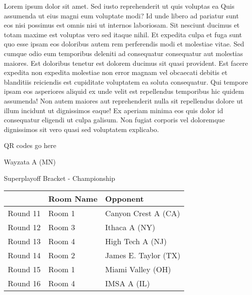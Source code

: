 \documentclass{article}%
\begin{document}
    Lorem ipsum dolor sit amet. Sed iusto reprehenderit ut quis voluptas ea Quis assumenda ut eius magni eum voluptate modi? Id unde libero ad pariatur sunt eos nisi possimus est omnis nisi ut internos laboriosam. Sit nesciunt ducimus et totam maxime est voluptas vero sed itaque nihil. Et expedita culpa et fuga sunt quo esse ipsam eos doloribus autem rem perferendis modi et molestiae vitae.\newline%
\newline%
    Sed cumque odio eum temporibus deleniti ad consequatur consequatur aut molestias maiores. Est doloribus tenetur est dolorem ducimus sit quasi provident. Est facere expedita non expedita molestiae non error magnam vel obcaecati debitis et blanditiis reiciendis est cupiditate voluptatem ea soluta consequatur. Qui tempore ipsam eos asperiores aliquid ex unde velit est repellendus temporibus hic quidem assumenda!\newline%
\newline%
    Non autem maiores aut reprehenderit nulla sit repellendus dolore ut illum incidunt ut dignissimos eaque! Ex aperiam minima eos quis dolor id consequatur eligendi ut culpa galisum. Non fugiat corporis vel doloremque dignissimos sit vero quasi sed voluptatem explicabo.\newline%
\newline%
\vspace*{30pt}%
\begin{center}%
\begin{Huge}%
QR codes go here%
\end{Huge}%
\end{center}%
\newpage%
\begin{center}%
\begin{Huge}%
Wayzata A (MN)%
\end{Huge}%
\vspace*{8pt}%
\linebreak%
\begin{Large}%
Superplayoff Bracket {-} Championship%
\end{Large}%
\end{center}%
%
\begin{tabularx}{\textwidth}{|c|Y|Y|}%
\hline%
&Room Name&Opponent\\%
\hline%
Round 11&Room 1&Canyon Crest A (CA)\\%
Round 12&Room 3&Ithaca A (NY)\\%
Round 13&Room 4&High Tech A (NJ)\\%
Round 14&Room 2&James E. Taylor (TX)\\%
Round 15&Room 1&Miami Valley (OH)\\%
Round 16&Room 4&IMSA A (IL)\\%
\hline%
\end{tabularx}%
\end{document}
